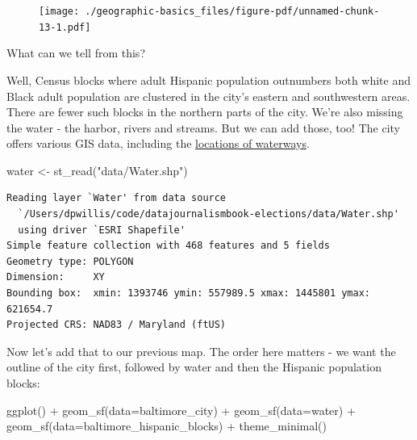 \documentclass[
  letterpaper,
  DIV=11,
  numbers=noendperiod]{scrreprt}
\newenvironment{Shaded}{\begin{snugshade}}{\end{snugshade}}
\newcommand{\AttributeTok}[1]{\textcolor[rgb]{0.40,0.45,0.13}{#1}}
\newcommand{\FunctionTok}[1]{\textcolor[rgb]{0.28,0.35,0.67}{#1}}
\newcommand{\NormalTok}[1]{\textcolor[rgb]{0.00,0.23,0.31}{#1}}
\newcommand{\OtherTok}[1]{\textcolor[rgb]{0.00,0.23,0.31}{#1}}
\newcommand{\SpecialCharTok}[1]{\textcolor[rgb]{0.37,0.37,0.37}{#1}}
\newcommand{\StringTok}[1]{\textcolor[rgb]{0.13,0.47,0.30}{#1}}
\begin{document}
\begin{figure}[H]

{\centering \texttt{[image: ./geographic-basics\_files/figure-pdf/unnamed-chunk-13-1.pdf]}

}

\end{figure}

What can we tell from this?

Well, Census blocks where adult Hispanic population outnumbers both
white and Black adult population are clustered in the city's eastern and
southwestern areas. There are fewer such blocks in the northern parts of
the city. We're also missing the water - the harbor, rivers and streams.
But we can add those, too! The city offers various GIS data, including
the
\href{https://data.baltimorecity.gov/datasets/water/explore?location=89.796632\%2C-66.364958\%2C0.00}{locations
of waterways}.

\begin{Shaded}
\begin{Highlighting}[]
\NormalTok{water }\OtherTok{\textless{}{-}} \FunctionTok{st\_read}\NormalTok{(}\StringTok{"data/Water.shp"}\NormalTok{)}
\end{Highlighting}
\end{Shaded}

\begin{verbatim}
Reading layer `Water' from data source 
  `/Users/dpwillis/code/datajournalismbook-elections/data/Water.shp' 
  using driver `ESRI Shapefile'
Simple feature collection with 468 features and 5 fields
Geometry type: POLYGON
Dimension:     XY
Bounding box:  xmin: 1393746 ymin: 557989.5 xmax: 1445801 ymax: 621654.7
Projected CRS: NAD83 / Maryland (ftUS)
\end{verbatim}

Now let's add that to our previous map. The order here matters - we want
the outline of the city first, followed by water and then the Hispanic
population blocks:

\begin{Shaded}
\begin{Highlighting}[]
\FunctionTok{ggplot}\NormalTok{() }\SpecialCharTok{+}
  \FunctionTok{geom\_sf}\NormalTok{(}\AttributeTok{data=}\NormalTok{baltimore\_city) }\SpecialCharTok{+}
  \FunctionTok{geom\_sf}\NormalTok{(}\AttributeTok{data=}\NormalTok{water) }\SpecialCharTok{+}
  \FunctionTok{geom\_sf}\NormalTok{(}\AttributeTok{data=}\NormalTok{baltimore\_hispanic\_blocks) }\SpecialCharTok{+}
  \FunctionTok{theme\_minimal}\NormalTok{()}
\end{Highlighting}
\end{Shaded}
\end{document}
